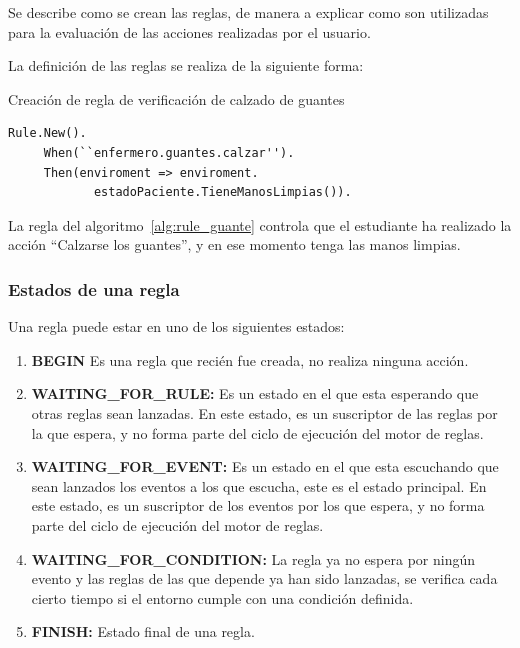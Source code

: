 Se describe como se crean las reglas, de manera a explicar como son utilizadas
para la evaluación de las acciones realizadas por el usuario.

La definición de las reglas se realiza de la siguiente forma:

\begin{algorithm}[H]
\caption{Creación de regla de verificación de calzado de guantes}
\label{alg:rule_guante}
\lstset{style=sharpc}
\begin{lstlisting}
Rule.New().
     When(``enfermero.guantes.calzar'').
     Then(enviroment => enviroment.
            estadoPaciente.TieneManosLimpias()).
\end{lstlisting}
\end{algorithm}

La regla del algoritmo~\ref{alg:rule_guante} controla que el estudiante ha
realizado la acción \enquote{Calzarse los guantes}, y en ese momento tenga las
manos limpias.

\subsubsection{Estados de una regla}

Una regla puede estar en uno de los siguientes estados:

\begin{enumerate}
\item \textbf{BEGIN} Es una regla que recién fue creada, no realiza ninguna
	acción.
\item \textbf{WAITING\_FOR\_RULE:} Es un estado en el que esta esperando que otras reglas
	sean lanzadas. En este estado, es un suscriptor de las reglas por la que
	espera, y no forma parte del ciclo de ejecución del motor de reglas.
\item \textbf{WAITING\_FOR\_EVENT:} Es un estado en el que esta escuchando que sean
	lanzados los eventos a los que escucha, este es el estado principal. En
	este estado, es un suscriptor de los eventos por los que espera, y no
	forma parte del ciclo de ejecución del motor de reglas.
\item \textbf{WAITING\_FOR\_CONDITION:} La regla ya no espera por ningún evento y las
	reglas de las que depende ya han sido lanzadas, se verifica cada cierto
	tiempo si el entorno cumple con una condición definida. 
\item \textbf{FINISH:} Estado final de una regla.
\end{enumerate}

